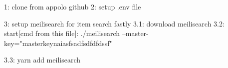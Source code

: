 1: clone from appolo github
2: setup .env file

3: setup meilisearch for item search fastly
3.1: download meilisearch
3.2: start[cmd from this file]: ./meilisearch --master-key="masterkeynaiasfsadfsdfdfdssf"

3.3: yarn add meilisearch